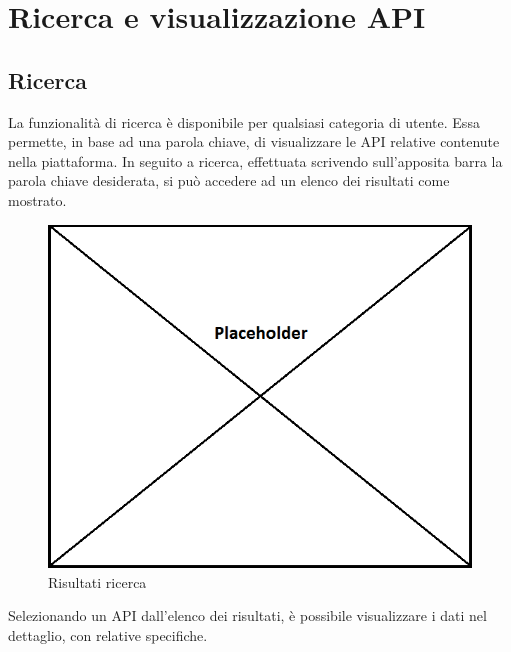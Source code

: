 \newpage
\section{Ricerca e visualizzazione API}

\subsection{Ricerca}
La funzionalità di ricerca è disponibile per qualsiasi categoria di utente. Essa permette, in base ad una parola chiave, di visualizzare le API relative contenute nella piattaforma. In seguito a ricerca, effettuata scrivendo sull'apposita barra la parola chiave desiderata, si può accedere ad un elenco dei risultati come mostrato.

\label{Risultati ricerca}
\begin{figure}[H]
	\centering
	\includegraphics[scale=0.45]{img/placeholder.png}
	\caption{Risultati ricerca}
\end{figure}

Selezionando un API dall'elenco dei risultati, è possibile visualizzare i dati nel dettaglio, con relative specifiche. 

